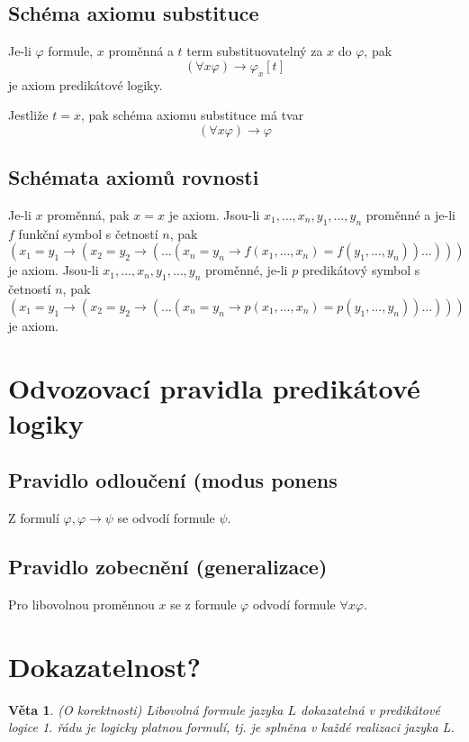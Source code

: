 \documentclass[a4paper, 11pt]{report}
\newtheorem{veta}{Věta}
\begin{document}
\subsection{Schéma axiomu substituce}
Je-li $\varphi$ formule, $x$ proměnná a $t$ term substituovatelný za $x$ do $\varphi$, pak
$$ (\forall x \varphi) \to \varphi_x[t] $$
je axiom predikátové logiky.

Jestliže $t = x$, pak schéma axiomu substituce má tvar
$$ (\forall x \varphi) \to \varphi $$


\subsection{Schémata axiomů rovnosti}
Je-li $x$ proměnná, pak $x = x$ je axiom. Jsou-li $x_1, \dots, x_n, y_1, \dots, y_n$ proměnné a je-li $f$ funkční symbol s četností $n$, pak
$$(x_1 = y_1 \to (x_2 = y_2 \to ( \dots (x_n = y_n \to f(x_1, \dots, x_n) = f(y_1, \dots, y_n)) \dots ))) $$
je axiom. Jsou-li $x_1, \dots, x_n, y_1, \dots, y_n$ proměnné, je-li $p$ predikátový symbol s četností $n$, pak
$$(x_1 = y_1 \to (x_2 = y_2 \to ( \dots (x_n = y_n \to p(x_1, \dots, x_n) = p(y_1, \dots, y_n)) \dots ))) $$
je axiom.

\section{Odvozovací pravidla predikátové logiky}

\subsection{Pravidlo odloučení (modus ponens}
Z formulí $\varphi, \varphi \to \psi$ se odvodí formule $\psi$.

\subsection{Pravidlo zobecnění (generalizace)}
Pro libovolnou proměnnou $x$ se z formule $\varphi$ odvodí formule $\forall x \varphi$.


\section{Dokazatelnost?}
\begin{veta}
(O korektnosti) Libovolná formule jazyka $L$ dokazatelná v predikátové logice 1. řádu je logicky platnou formulí, tj. je splněna v každé realizaci jazyka L.
\end{veta}
\end{document}
